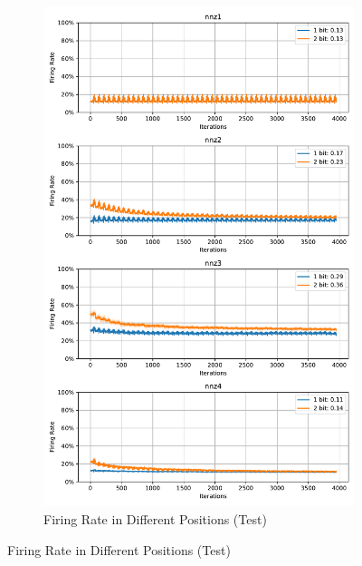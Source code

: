         \begin{figure}[H]
            \centering
            \ContinuedFloat
            \begin{subfigure}[H]{\textwidth}
                \centering
                \includegraphics[width=\textwidth]{../firerate/MNIST/plots/mnist_test_firerate.pdf}
                \caption{Firing Rate in Different Positions (Test)}
            \end{subfigure}
        \end{figure}
